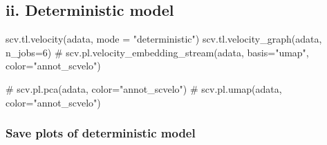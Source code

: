 \documentclass[
  letterpaper,
  DIV=11,
  numbers=noendperiod]{scrreprt}
\newenvironment{Shaded}{\begin{snugshade}}{\end{snugshade}}
\newcommand{\CommentTok}[1]{\textcolor[rgb]{0.37,0.37,0.37}{#1}}
\newcommand{\DecValTok}[1]{\textcolor[rgb]{0.68,0.00,0.00}{#1}}
\newcommand{\NormalTok}[1]{\textcolor[rgb]{0.00,0.23,0.31}{#1}}
\newcommand{\OperatorTok}[1]{\textcolor[rgb]{0.37,0.37,0.37}{#1}}
\newcommand{\StringTok}[1]{\textcolor[rgb]{0.13,0.47,0.30}{#1}}
\begin{document}
\subsection{ii. Deterministic model}\label{ii.-deterministic-model}

\begin{Shaded}
\begin{Highlighting}[]
\NormalTok{scv.tl.velocity(adata, mode }\OperatorTok{=} \StringTok{"deterministic"}\NormalTok{)}
\NormalTok{scv.tl.velocity\_graph(adata, n\_jobs}\OperatorTok{=}\DecValTok{6}\NormalTok{)}
\CommentTok{\# scv.pl.velocity\_embedding\_stream(adata, basis="umap", color="annot\_scvelo")}

\CommentTok{\# scv.pl.pca(adata, color="annot\_scvelo")}
\CommentTok{\# scv.pl.umap(adata, color="annot\_scvelo")}
\end{Highlighting}
\end{Shaded}

\subsubsection{Save plots of deterministic
model}\label{save-plots-of-deterministic-model}
\end{document}
